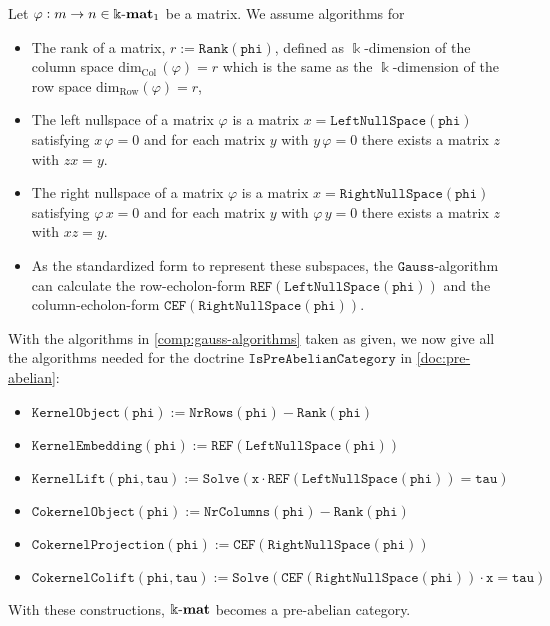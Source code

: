 \begin{computation}\label{comp:gauss-algorithms}
Let $\varphi : m \rightarrow n \in \Bbbk\textnormal{-}\mathbf{mat}_{1}$ be a matrix. We assume algorithms for 
\begin{itemize}
\item The rank of a matrix, $r := \mathtt{Rank( phi )}$, defined as $\Bbbk$-dimension of the column space
$\mathrm{dim_{Col}}\,( \varphi ) = r$ which is the
same
as the $\Bbbk$-dimension of the row space $\mathrm{dim_{Row}}( \varphi ) = r$,
\item The left nullspace of a matrix $\varphi$ is a matrix $x = \mathtt{LeftNullSpace( phi )}$ satisfying $x\, \varphi = 0$ and
for each matrix $y$ with $y\,\varphi = 0$ there exists a matrix $z$ with $zx = y$.
\item The right nullspace of a matrix $\varphi$ is a matrix $x = \mathtt{RightNullSpace( phi )}$ satisfying $\varphi \,x= 0$ and
for each matrix $y$ with $\varphi \,y= 0$ there exists a matrix $z$ with $xz = y$.
\item As the standardized form to represent these subspaces, the $\mathtt{Gauss}$-algorithm can calculate the
row-echolon-form $\mathtt{REF( LeftNullSpace( phi ) )}$ and the\\
column-echolon-form $\mathtt{CEF( RightNullSpace( phi ) )}$.
\end{itemize}
\end{computation}

\begin{example}\label{ex:kmat_pre-abelian}
With the algorithms in \ref{comp:gauss-algorithms} taken as given, we now give all the algorithms needed for the doctrine
$\mathtt{IsPreAbelianCategory}$ in \ref{doc:pre-abelian}:
\begin{itemize}
\item $\mathtt{KernelObject( phi ) := NrRows( phi ) - Rank( phi )}$
\item $\mathtt{KernelEmbedding( phi ) := REF( LeftNullSpace( phi ) )}$
\item $\mathtt{KernelLift( phi, tau ) := Solve( x \cdot REF( LeftNullSpace( phi ) ) = tau )}$
\item $\mathtt{CokernelObject( phi ) := NrColumns( phi ) - Rank( phi )}$
\item $\mathtt{CokernelProjection( phi ) := CEF( RightNullSpace( phi ) )}$
\item $\mathtt{CokernelColift( phi, tau ) := Solve( CEF( RightNullSpace( phi ) ) \cdot x = tau )}$
\end{itemize}
With these constructions, $\Bbbk\textnormal{-}\mathbf{mat}$ becomes a pre-abelian category.
\end{example}

